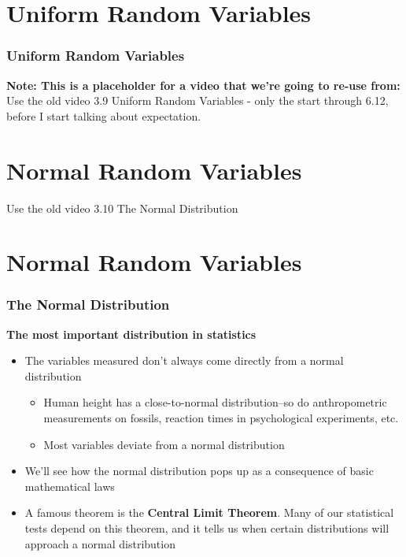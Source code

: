\documentclass[12pt, block=fill]{beamer}
\begin{document}
 
\section{Uniform Random Variables}

\begin{frame}
  \frametitle{Uniform Random Variables}

  \textbf{Note: This is a placeholder for a video that we're going to
    re-use from:} Use the old video 3.9 Uniform Random Variables -
  only the start through 6.12, before I start talking about
  expectation.

\end{frame}

\section{Normal Random Variables}

\begin{frame}  
Use the old video 3.10 The Normal Distribution
\end{frame}







\section{Normal Random Variables}

\begin{frame}
  \frametitle{The Normal Distribution}
  \textbf{The most important distribution in statistics}
  \begin{itemize}
    \item The variables measured don't always come directly from a normal distribution
    \begin{itemize}
      \item Human height has a close-to-normal distribution--so do anthropometric measurements on fossils, reaction times in psychological experiments, etc.
      \item Most variables deviate from a normal distribution
    \end{itemize}
    \item We'll see how the normal distribution pops up as a consequence of basic mathematical laws
    \item A famous theorem is the \textbf{Central Limit Theorem}. Many of our statistical tests depend on this theorem, and it tells us when certain distributions will approach a normal distribution
  \end{itemize}
\end{frame}
\end{document}
